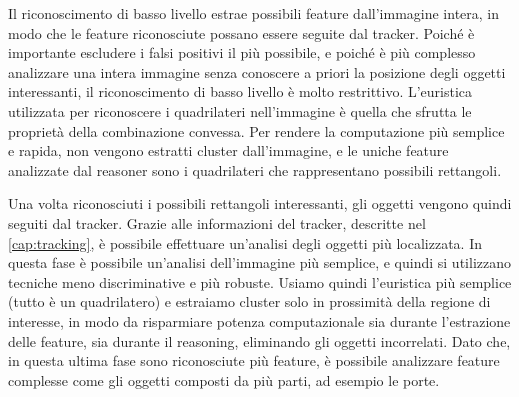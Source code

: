 Il riconoscimento di basso livello estrae possibili feature dall'immagine intera, in modo che le feature riconosciute possano essere seguite dal tracker. Poiché è importante escludere i falsi positivi il più possibile, e poiché è più complesso analizzare una intera immagine senza conoscere a priori la posizione degli oggetti interessanti, il riconoscimento di basso livello è molto restrittivo. L'euristica utilizzata per riconoscere i quadrilateri nell'immagine è quella che sfrutta le proprietà della combinazione convessa.
Per rendere la computazione più semplice e rapida, non vengono estratti cluster dall'immagine, e le uniche feature analizzate dal reasoner sono i quadrilateri che rappresentano possibili rettangoli.

Una volta riconosciuti i possibili rettangoli interessanti, gli oggetti vengono quindi seguiti dal tracker. Grazie alle informazioni del tracker, descritte nel \autoref{cap:tracking}, è possibile effettuare un'analisi degli oggetti più localizzata. In questa fase è possibile un'analisi dell'immagine più semplice, e quindi si utilizzano tecniche meno discriminative e più robuste. Usiamo quindi l'euristica più semplice (tutto è un quadrilatero) e estraiamo cluster solo in prossimità della regione di interesse, in modo da risparmiare potenza computazionale sia durante l'estrazione delle feature, sia durante il reasoning, eliminando gli oggetti incorrelati. Dato che, in questa ultima fase sono riconosciute più feature, è possibile analizzare feature complesse come gli oggetti composti da più parti, ad esempio le porte.
